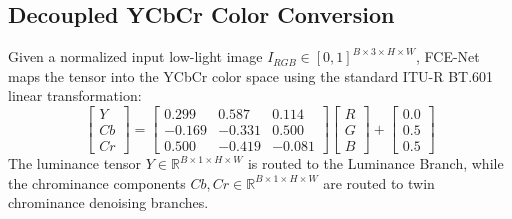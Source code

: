 \documentclass[10pt,twocolumn,letterpaper]{article}
\begin{document}
\subsection{Decoupled YCbCr Color Conversion}
Given a normalized input low-light image $I_{RGB} \in [0, 1]^{B \times 3 \times H \times W}$, FCE-Net maps the tensor into the YCbCr color space using the standard ITU-R BT.601 linear transformation:
\begin{equation}
\begin{bmatrix}
Y \\ Cb \\ Cr
\end{bmatrix}
=
\begin{bmatrix}
0.299 & 0.587 & 0.114 \\
-0.169 & -0.331 & 0.500 \\
0.500 & -0.419 & -0.081
\end{bmatrix}
\begin{bmatrix}
R \\ G \\ B
\end{bmatrix}
+
\begin{bmatrix}
0.0 \\ 0.5 \\ 0.5
\end{bmatrix}
\label{eq:yuv_transform}
\end{equation}
The luminance tensor $Y \in \mathbb{R}^{B \times 1 \times H \times W}$ is routed to the Luminance Branch, while the chrominance components $Cb, Cr \in \mathbb{R}^{B \times 1 \times H \times W}$ are routed to twin chrominance denoising branches.
\end{document}
